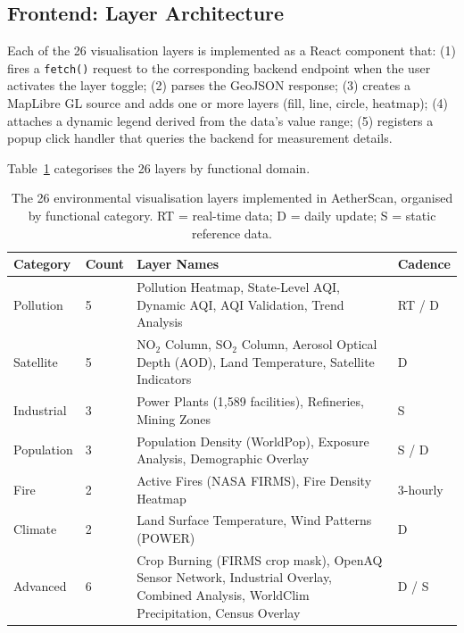 \documentclass[12pt,a4paper]{article}
\begin{document}
\subsection{Frontend: Layer Architecture}
\label{sec:impl:layers}

Each of the 26 visualisation layers is implemented as a React component that:
(1) fires a \texttt{fetch()} request to the corresponding backend endpoint when
the user activates the layer toggle; (2) parses the GeoJSON response; (3) creates
a MapLibre GL source and adds one or more layers (fill, line, circle, heatmap);
(4) attaches a dynamic legend derived from the data's value range; (5) registers
a popup click handler that queries the backend for measurement details.

Table~\ref{tab:layers} categorises the 26 layers by functional domain.

\begin{table}[H]
\centering
\caption[Environmental visualisation layers by category]{%
The 26 environmental visualisation layers implemented in AetherScan,
organised by functional category. RT = real-time data; D = daily update;
S = static reference data.}
\label{tab:layers}
\begin{tabularx}{\textwidth}{@{}llXl@{}}
\toprule
\textbf{Category} & \textbf{Count} & \textbf{Layer Names} & \textbf{Cadence} \\
\midrule
Pollution & 5 &
  Pollution Heatmap, State-Level AQI, Dynamic AQI, AQI Validation,
  Trend Analysis & RT / D \\
Satellite & 5 &
  NO$_2$ Column, SO$_2$ Column, Aerosol Optical Depth (AOD),
  Land Temperature, Satellite Indicators & D \\
Industrial & 3 &
  Power Plants (1,589 facilities), Refineries, Mining Zones & S \\
Population & 3 &
  Population Density (WorldPop), Exposure Analysis, Demographic Overlay & S / D \\
Fire & 2 &
  Active Fires (NASA FIRMS), Fire Density Heatmap & 3-hourly \\
Climate & 2 &
  Land Surface Temperature, Wind Patterns (POWER) & D \\
Advanced & 6 &
  Crop Burning (FIRMS crop mask), OpenAQ Sensor Network,
  Industrial Overlay, Combined Analysis,
  WorldClim Precipitation, Census Overlay & D / S \\
\bottomrule
\end{tabularx}
\end{table}
\end{document}
